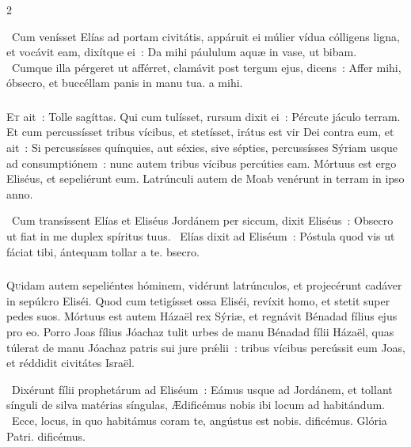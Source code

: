 \documentclass[9pt,twoside]{extarticle}
\begin{document}
\begin{multicols}{2}
\begin{tightlist}{}
\item {}~Cum venísset Elías ad portam civitátis, appáruit ei múlier vídua cólligens ligna, et vocávit eam, dixítque ei~: \textred{*} Da mihi páululum aquæ in vase, ut bibam. ~Cumque illa pérgeret ut afférret, clamávit post tergum ejus, dicens~: Affer mihi, óbsecro, et buccéllam panis in manu tua. a mihi.
\end{tightlist}

\subsubsection*{\center {}}
\lettrine{E}t ait~: Tolle sagíttas. Qui cum tulísset, rursum dixit ei~: Pércute jáculo terram. Et cum percussísset tribus vícibus, et stetísset,
irátus est vir Dei contra eum, et ait~: Si percussísses quínquies, aut séxies, sive sépties, percussísses Sýriam usque ad consumptiónem~: nunc autem tribus vícibus percúties eam.
Mórtuus est ergo Eliséus, et sepeliérunt eum. Latrúnculi autem de Moab venérunt in terram in ipso anno.

\begin{tightlist}{}
\item {}~Cum transíssent Elías et Eliséus Jordánem per siccum, dixit Eliséus~: \textred{*} Obsecro ut fiat in me duplex spíritus tuus. ~Elías dixit ad Eliséum~: Póstula quod vis ut fáciat tibi, ántequam tollar a te. bsecro.
\end{tightlist}

\subsubsection*{\center {}}
\lettrine{Q}uidam autem sepeliéntes hóminem, vidérunt latrúnculos, et projecérunt cadáver in sepúlcro Eliséi. Quod cum tetigísset ossa Eliséi, revíxit homo, et stetit super pedes suos. Mórtuus est autem Házaël rex Sýriæ, et regnávit Bénadad fílius ejus pro eo.
Porro Joas fílius Jóachaz tulit urbes de manu Bénadad fílii Házaël, quas túlerat de manu Jóachaz patris sui jure prǽlii~: tribus vícibus percússit eum Joas, et réddidit civitátes Israël.

\begin{tightlist}{}
\item {}~Dixérunt fílii prophetárum ad Eliséum~: Eámus usque ad Jordánem, et tollant sínguli de silva matérias síngulas, \textred{*} Ædificémus nobis ibi locum ad habitándum. ~Ecce, locus, in quo habitámus coram te, angústus est nobis. dificémus. Glória Patri. dificémus.
\end{tightlist}


\end{multicols}
\end{document}
